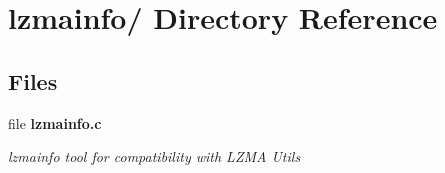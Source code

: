 \section{lzmainfo/ Directory Reference}
\label{dir_83dd0c573621ca152f093e9ce703e37a}
\subsection*{Files}
\begin{DoxyCompactItemize}
\item 
file {\bf lzmainfo.\-c}
\begin{DoxyCompactList}\small\item\em lzmainfo tool for compatibility with L\-Z\-M\-A Utils \end{DoxyCompactList}\end{DoxyCompactItemize}
